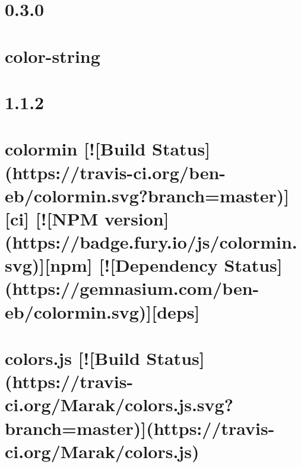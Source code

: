 \documentclass[twoside]{book}
\newcommand{\+}{\discretionary{\mbox{\scriptsize$\hookleftarrow$}}{}{}}
\begin{document}
\chapter{0.3.0}
\label{md__c_1_workspace_demo_src_main_script_node_modules_color-string__c_h_a_n_g_e_l_o_g}

\chapter{color-\/string}
\label{md__c_1_workspace_demo_src_main_script_node_modules_color-string__r_e_a_d_m_e}

\chapter{1.1.2}
\label{md__c_1_workspace_demo_src_main_script_node_modules_colormin__c_h_a_n_g_e_l_o_g}

\chapter{colormin \mbox{[}!\mbox{[}Build Status\mbox{]}(https\+://travis-\/ci.org/ben-\/eb/colormin.svg?branch=master)\mbox{]}\mbox{[}ci\mbox{]} \mbox{[}!\mbox{[}N\+PM version\mbox{]}(https\+://badge.fury.\+io/js/colormin.svg)\mbox{]}\mbox{[}npm\mbox{]} \mbox{[}!\mbox{[}Dependency Status\mbox{]}(https\+://gemnasium.com/ben-\/eb/colormin.svg)\mbox{]}\mbox{[}deps\mbox{]}}
\label{md__c_1_workspace_demo_src_main_script_node_modules_colormin__r_e_a_d_m_e}

\chapter{colors.\+js \mbox{[}!\mbox{[}Build Status\mbox{]}(https\+://travis-\/ci.org/\+Marak/colors.js.\+svg?branch=master)\mbox{]}(https\+://travis-\/ci.org/\+Marak/colors.js)}
\label{md__c_1_workspace_demo_src_main_script_node_modules_colors__read_me}

\end{document}

